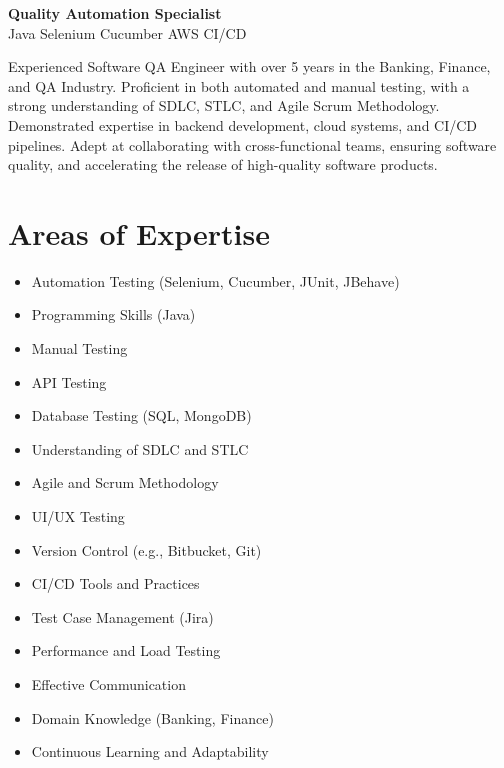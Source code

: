 \documentclass[11pt,a4paper,sans]{moderncv}
\begin{document}
    \maketitle
    \begin{center}
    {\Large \textbf{Quality Automation Specialist}} \\
    \small Java \textbar{} Selenium \textbar{} Cucumber \textbar{} AWS \textbar{} CI/CD
    \end{center}
    Experienced Software QA Engineer with over 5 years in the Banking, Finance, and QA Industry.
    Proficient in both automated and manual testing, with a strong understanding of SDLC, STLC, and Agile Scrum Methodology.
    Demonstrated expertise in backend development, cloud systems, and CI/CD pipelines.
    Adept at collaborating with cross-functional teams, ensuring software quality, and accelerating the release of high-quality software products.
    

    \section{Areas of Expertise}
    \begin{minipage}{0.5\linewidth}
        \begin{itemize}
            \item Automation Testing (Selenium, Cucumber, JUnit, JBehave)
            \item Programming Skills (Java)
            \item Manual Testing
            \item API Testing
            \item Database Testing (SQL, MongoDB)
            \item Understanding of SDLC and STLC
            \item Agile and Scrum Methodology
            \item UI/UX Testing
        \end{itemize}
    \end{minipage}
    \begin{minipage}{0.5\linewidth}
        \begin{itemize}
            \item Version Control (e.g., Bitbucket, Git)
            \item CI/CD Tools and Practices
            \item Test Case Management (Jira)
            \item Performance and Load Testing
            \item Effective Communication
            \item Domain Knowledge (Banking, Finance)
            \item Continuous Learning and Adaptability
        \end{itemize}
    \end{minipage}
\end{document}
